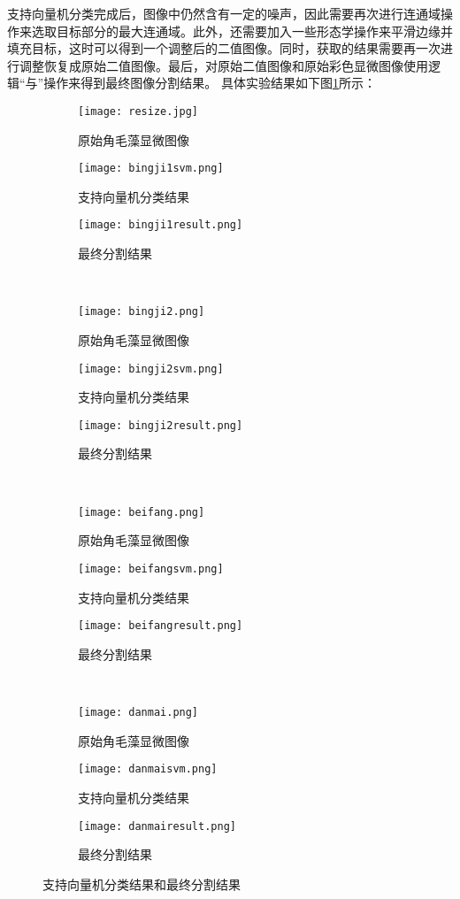 支持向量机分类完成后，图像中仍然含有一定的噪声，因此需要再次进行连通域操作来选取目标部分的最大连通域。此外，还需要加入一些形态学操作来平滑边缘并填充目标，这时可以得到一个调整后的二值图像。同时，获取的结果需要再一次进行调整恢复成原始二值图像。最后，对原始二值图像和原始彩色显微图像使用逻辑“与”操作来得到最终图像分割结果。
具体实验结果如下图\ref{svm}所示：
\begin{figure}[h]
  \centering
  \begin{subfigure}{0.3\textwidth}
   \texttt{[image: resize.jpg]}
   \caption{原始角毛藻显微图像}
  \end{subfigure}
  \begin{subfigure}{0.3\textwidth}
    \texttt{[image: bingji1svm.png]}
    \caption{支持向量机分类结果}
  \end{subfigure}
  \begin{subfigure}{0.3\textwidth}
    \texttt{[image: bingji1result.png]}
    \caption{最终分割结果}
  \end{subfigure}
  \\
  \begin{subfigure}{0.3\textwidth}
    \texttt{[image: bingji2.png]}
    \caption{原始角毛藻显微图像}
  \end{subfigure}
 \begin{subfigure}{0.3\textwidth}
    \texttt{[image: bingji2svm.png]}
    \caption{支持向量机分类结果}
  \end{subfigure}
 \begin{subfigure}{0.3\textwidth}
    \texttt{[image: bingji2result.png]}
    \caption{最终分割结果}
  \end{subfigure}
 \\
 \begin{subfigure}{0.3\textwidth}
    \texttt{[image: beifang.png]}
    \caption{原始角毛藻显微图像}
  \end{subfigure}
  \begin{subfigure}{0.3\textwidth}
    \texttt{[image: beifangsvm.png]}
    \caption{支持向量机分类结果}
  \end{subfigure}
   \begin{subfigure}{0.3\textwidth}
    \texttt{[image: beifangresult.png]}
    \caption{最终分割结果}
  \end{subfigure}
  \\
   \begin{subfigure}{0.3\textwidth}
    \texttt{[image: danmai.png]}
    \caption{原始角毛藻显微图像}
  \end{subfigure}
   \begin{subfigure}{0.3\textwidth}
    \texttt{[image: danmaisvm.png]}
    \caption{支持向量机分类结果}
  \end{subfigure}
   \begin{subfigure}{0.3\textwidth}
    \texttt{[image: danmairesult.png]}
    \caption{最终分割结果}
  \end{subfigure}
  \caption{支持向量机分类结果和最终分割结果}
  \label{svm}
\end{figure}


